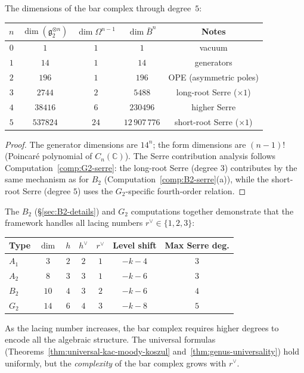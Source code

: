 \begin{proposition}
\label{prop:G2-bar-dims}
The dimensions of the bar complex through degree~$5$:
\begin{center}
\renewcommand{\arraystretch}{1.2}
\begin{tabular}{c|ccc|c}
$n$ & $\dim(\mathfrak{g}_2^{\otimes n})$ &
$\dim \Omega^{n-1}$ & $\dim \bar{B}^n$ &
Notes \\
\hline
$0$ & $1$ & $1$ & $1$ & vacuum \\
$1$ & $14$ & $1$ & $14$ & generators \\
$2$ & $196$ & $1$ & $196$ & OPE (asymmetric poles) \\
$3$ & $2744$ & $2$ & $5488$ & long-root Serre ($\times 1$) \\
$4$ & $38416$ & $6$ & $230496$ & higher Serre \\
$5$ & $537824$ & $24$ & $12\,907\,776$ & short-root Serre ($\times 1$)
\end{tabular}
\end{center}
\end{proposition}

\begin{proof}
The generator dimensions are $14^n$; the form dimensions
are $(n-1)!$ (Poincar\'{e} polynomial of $C_n(\mathbb{C})$).
The Serre contribution analysis follows
Computation~\ref{comp:G2-serre}: the long-root Serre (degree $3$)
contributes by the same mechanism as for $B_2$
(Computation~\ref{comp:B2-serre}(a)), while the short-root
Serre (degree $5$) uses the $G_2$-specific fourth-order relation.
\end{proof}

\begin{remark}\label{rem:G2-context}
The $B_2$ (\S\ref{sec:B2-details}) and $G_2$ computations together
demonstrate that the framework handles all lacing numbers
$r^\vee \in \{1, 2, 3\}$:
\begin{center}
\renewcommand{\arraystretch}{1.2}
\begin{tabular}{lcccccc}
\textbf{Type} & $\dim$ & $h$ & $h^\vee$ & $r^\vee$ &
\textbf{Level shift} & \textbf{Max Serre deg.} \\
\hline
$A_1$ & $3$ & $2$ & $2$ & $1$ & $-k-4$ & $3$ \\
$A_2$ & $8$ & $3$ & $3$ & $1$ & $-k-6$ & $3$ \\
$B_2$ & $10$ & $4$ & $3$ & $2$ & $-k-6$ & $4$ \\
$G_2$ & $14$ & $6$ & $4$ & $3$ & $-k-8$ & $5$
\end{tabular}
\end{center}
As the lacing number increases, the bar complex requires higher
degrees to encode all the algebraic structure.  The universal
formulas (Theorems~\ref{thm:universal-kac-moody-koszul}
and~\ref{thm:genus-universality}) hold uniformly, but the
\emph{complexity} of the bar complex grows with $r^\vee$.
\end{remark}


